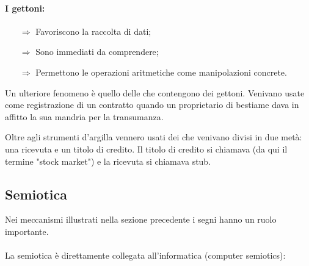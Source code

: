 \paragraph{I gettoni:}

\begin{itemize}
    \item [$\Rightarrow$] Favoriscono la raccolta di dati;
    \item [$\Rightarrow$] Sono immediati da comprendere;
    \item [$\Rightarrow$] Permettono le operazioni aritmetiche come manipolazioni concrete.
\end{itemize}

Un ulteriore fenomeno è quello delle  che contengono dei gettoni. Venivano usate come registrazione di un contratto quando un proprietario di bestiame dava in affitto la sua mandria per la transumanza.

Oltre agli strumenti d'argilla vennero usati dei  che venivano divisi in due metà: una ricevuta e un titolo di credito. Il titolo di credito si chiamava  (da qui il termine "stock market") e la ricevuta si chiamava stub.

\subsection{Semiotica}

Nei meccanismi illustrati nella sezione precedente i segni hanno un ruolo importante. 


\paragraph{}

La semiotica è direttamente collegata all'informatica (computer semiotics):

